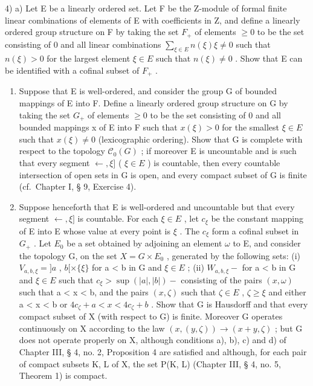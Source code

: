 4) a) Let E be a linearly ordered set. Let F be the Z-module of formal finite linear combinations of elements of E with coefficients in Z, and define a linearly ordered group structure on F by taking the set \(F_{+}\) of elements \(\geqslant 0\) to be the set consisting of 0 and all linear combinations \(\sum_{\xi \in E} n(\xi) \xi \neq 0\) such that \(n(\xi) > 0\) for the largest element \(\xi \in E\) such that \(n(\xi) \neq 0\) . Show that E can be identified with a cofinal subset of \(F_{+}\) .

\begin{enumerate}
\def\labelenumi{\alph{enumi})}
\setcounter{enumi}{1}
\item
  Suppose that E is well-ordered, and consider the group G of bounded mappings of E into F. Define a linearly ordered group structure on G by taking the set \(G_{+}\) of elements \(\geqslant0\) to be the set consisting of 0 and all bounded mappings x of E into F such that \(x(\xi)>0\) for the smallest \(\xi\in E\) such that \(x(\xi)\neq0\) (lexicographic ordering). Show that G is complete with respect to the topology \(\mathcal{C}_{0}(G)\) ; if moreover E is uncountable and is such that every segment \(\leftarrow,\xi]\) ( \(\xi\in E\) ) is countable, then every countable intersection of open sets in G is open, and every compact subset of G is finite (cf.~Chapter I, § 9, Exercise 4).
\item
  Suppose henceforth that E is well-ordered and uncountable but that every segment \(\leftarrow,\xi]\) is countable. For each \(\xi\in E\) , let \(c_{\xi}\) be the constant mapping of E into E whose value at every point is \(\xi\) . The \(c_{\xi}\) form a cofinal subset in \(G_{+}\) . Let \(E_{0}\) be a set obtained by adjoining an element \(\omega\) to E, and consider the topology G, on the set \(X=G\times E_{0}\) , generated by the following sets: (i) \(V_{a,b,\xi} = ]a\) , \(b[\times\{\xi\}\) for a \textless{} b in G and \(\xi\in E\) ; (ii) \(W_{a,b,\xi} -\) for a \textless{} b in G and \(\xi\in E\) such that \(c_{\xi} > \sup(|a|, |b|) -\) consisting of the pairs \((x, \omega)\) such that a \textless{} x \textless{} b, and the pairs \((x, \zeta)\) such that \(\zeta\in E\) , \(\zeta \geqslant \xi\) and either a \textless{} x \textless{} b or \(4c_{\zeta} + a < x < 4c_{\zeta} + b\) . Show that G is Hausdorff and that every compact subset of X (with respect to G) is finite. Moreover G operates continuously on X according to the law \((x, (y, \zeta)) \to (x + y, \zeta)\) ; but G does not operate properly on X, although conditions a), b), c) and d) of Chapter III, § 4, no. 2, Proposition 4 are satisfied and although, for each pair of compact subsets K, L of X, the set P(K, L) (Chapter III, § 4, no. 5, Theorem 1) is compact.
\end{enumerate}
\relax{}
